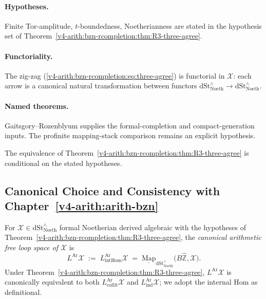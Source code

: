 \paragraph{Hypotheses.} Finite Tor-amplitude, \(t\)-boundedness,
Noetherianness are stated in the hypothesis set of
Theorem~\ref{v4-arith:bzn-rcompletion:thm:R3-three-agree}.

\paragraph{Functoriality.} The zig-zag
(\ref{v4-arith:bzn-rcompletion:eq:three-agree})
is functorial in \(\mathcal{X}\): each arrow is a canonical natural
transformation between functors
\(\mathrm{dSt}^{\wedge}_{\mathrm{Noeth}}\to\mathrm{dSt}^{\wedge}_{\mathrm{Noeth}}\).

\paragraph{Named theorems.} Gaitsgory--Rozenblyum supplies the
formal-completion and compact-generation inputs.  The profinite
mapping-stack comparison remains an explicit hypothesis.

The equivalence of
Theorem~\ref{v4-arith:bzn-rcompletion:thm:R3-three-agree} is conditional on
the stated hypotheses.

\subsection{Canonical Choice and Consistency with Chapter~\ref{v4-arith:arith-bzn}}

\begin{definition}
\label{v4-arith:bzn-rcompletion:def:canonical-L-Ar}
For \(\mathcal{X}\in\mathrm{dSt}^{\wedge}_{\mathrm{Noeth}}\) formal
Noetherian derived algebraic with the hypotheses of
Theorem~\ref{v4-arith:bzn-rcompletion:thm:R3-three-agree}, the
\emph{canonical arithmetic free loop space of \(\mathcal{X}\)} is
\begin{equation}
L^{\mathrm{Ar}}\mathcal{X}\;:=\;L^{\mathrm{Ar}}_{\mathrm{intHom}}\mathcal{X}
\;=\;\underline{\mathrm{Map}}_{\mathrm{dSt}^{\wedge}_{\mathrm{Noeth}}}\bigl(B\widehat{\mathbb{Z}},\mathcal{X}\bigr).
\end{equation}
Under
Theorem~\ref{v4-arith:bzn-rcompletion:thm:R3-three-agree},
\(L^{\mathrm{Ar}}\mathcal{X}\) is canonically equivalent to both
\(L^{\mathrm{Ar}}_{\mathrm{cofilt}}\mathcal{X}\) and
\(L^{\mathrm{Ar}}_{\mathrm{ind}}\mathcal{X}\); we adopt the internal
Hom as definitional.
\end{definition}

